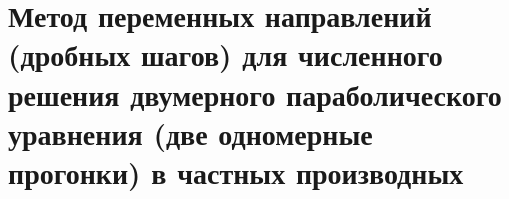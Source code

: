 \documentclass[__main__.tex]{subfiles}
\begin{document}
\section{Метод переменных направлений (дробных шагов) для численного решения двумерного параболического уравнения (две одномерные прогонки) в частных производных}
\end{document}
